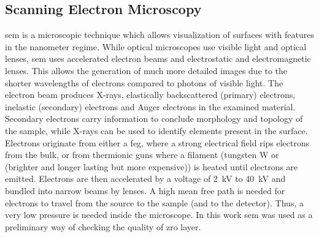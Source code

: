 \subsection{Scanning Electron Microscopy}
\Gls{sem} is a microscopic technique which allows visualization of surfaces with features in the nanometer regime. 
While optical microscopes use visible light and optical lenses, \gls{sem} uses accelerated electron beams and electrostatic and electromagnetic lenses.
This allows the generation of much more detailed images due to the shorter wavelengths of electrons compared to photons of visible light\cite{Kaliva2020}.
The electron beam produces X-rays, elastically backscattered (primary) electrons, inelastic (secondary) electrons and Auger electrons in the examined material. 
Secondary electrons carry information to conclude morphology and topology of the sample, while X-rays can be used to identify elements present in the surface. 
Electrons originate from either a \gls{feg}, where a strong electrical field rips electrons from the bulk, or from thermionic guns where a filament (tungsten W or  (brighter and longer lasting but more expensive)) is heated until electrons are emitted. 
Electrons are then accelerated by a voltage of \SI{2}{\kilo\volt} to \SI{40}{\kilo\volt} and bundled into narrow beams by lenses\cite{Vernon2000}.
A high mean free path is needed for electrons to travel from the source to the sample (and to the detector). 
Thus, a very low pressure is needed inside the microscope. 
In this work \gls{sem} was used as a preliminary way of checking the quality of \gls{zro} layer. 
\enlargethispage{\baselineskip}


